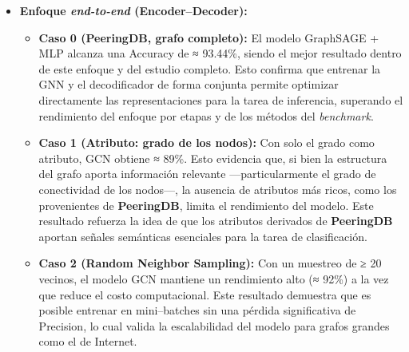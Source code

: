 \begin{itemize}
\begin{itemize}
        \item \textbf{Caso 6 (BGP2Vec):} ≈94.5\%, el mejor resultado del enfoque por etapas. A diferencia de DeepWalk, que modela la topología de manera puramente estructural, BGP2Vec incorpora la secuencia real de los caminos BGP, reflejando la frecuencia con que ciertos AS aparecen en las rutas. Esto hace que los nodos con mayor recurrencia en los caminos adquieran una mayor relevancia topológica, relacionada con su papel como proveedores de tránsito o puntos de interconexión clave.
        En consecuencia, los \textit{embeddings} de BGP2Vec representan no solo la conectividad, sino también la importancia funcional de los AS en la estructura jerárquica y económica de Internet, lo que explica su superior desempeño en la tarea de inferencia de relaciones.

        
    \end{itemize}
    
    \item \textbf{Enfoque \textit{end-to-end} (Encoder–Decoder):}
        \begin{itemize}
        \item \textbf{Caso 0 (PeeringDB, grafo completo):} El modelo GraphSAGE + MLP alcanza una Accuracy de ≈ 93.44\%, siendo el mejor resultado dentro de este enfoque y del estudio completo.
        Esto confirma que entrenar la GNN y el decodificador de forma conjunta permite optimizar directamente las representaciones para la tarea de inferencia, superando el rendimiento del enfoque por etapas y de los métodos del \textit{benchmark}.
    \item \textbf{Caso 1 (Atributo: grado de los nodos):}  
    Con solo el grado como atributo, GCN obtiene ≈ 89\%. Esto evidencia que, si bien la estructura del grafo aporta información relevante —particularmente el grado de conectividad de los nodos—, la ausencia de atributos más ricos, como los provenientes de \textbf{PeeringDB}, limita el rendimiento del modelo.  
    Este resultado refuerza la idea de que los atributos derivados de \textbf{PeeringDB} aportan señales semánticas esenciales para la tarea de clasificación.
     
    
    
    \item \textbf{Caso 2 (Random Neighbor Sampling):}  
    Con un muestreo de ≥ 20 vecinos, el modelo GCN mantiene un rendimiento alto (≈ 92\%) a la vez que reduce el costo computacional.  
    Este resultado demuestra que es posible entrenar en mini–batches sin una pérdida significativa de Precision, lo cual valida la escalabilidad del modelo para grafos grandes como el de Internet.  
    

\end{itemize}
\end{itemize}

